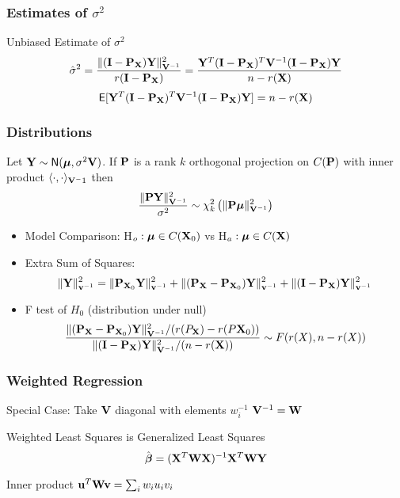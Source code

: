 \documentclass[]{beamer}
\begin{document}
\begin{frame}
  \frametitle{Estimates of $\sigma^2$}
\vspace{-24pt}
Unbiased Estimate of $\sigma^2$ 
$$ \shat = \frac{\| (\I - \P_\X)\Y \|^2_{\V^{-1}}}{r(\I - \P_\X)} =
\frac{\Y^T(\I - \P_{\X})^T \V^{-1}   (\I - \P_{\X}) \Y}{n - r(\X)}$$ 
$$\E[\Y^T(\I - \P_{\X})^T \V^{-1}   (\I - \P_{\X}) \Y] = n - r(\X)$$
\vfill
\end{frame}

\begin{frame}
  \frametitle{Distributions}
  \begin{theorem}
Let $\Y \sim \N(\mub, \sigma^2\V)$.
If $\P$ is a rank $k$ orthogonal projection on $C(\P)$ with
inner product $\langle \cdot, \cdot \rangle_{\V^-1}$ then 
$$ \frac{\| \P \Y \|^2_{\V^{-1}}}{\sigma^2} \sim \chi^2_{k}
\left( \| \P \mub \|^2_{\V^{-1}}\right)$$  
  \end{theorem} \pause


  \begin{itemize}
  \item Model Comparison:  H$_o: \mub \in C(\X_0)$ vs H$_a: \mub \in
    C(\X)$ \pause
  \item Extra Sum of Squares:  
$$ \|\Y\|^2_{\v^{-1}} = \|\P_{\X_0}\Y\|^2_{\v^{-1}} + \|( \P_\X -
\P_{\X_0})\Y\|^2_{\v^{-1}} + \|(\I - \P_{\X})\Y\|^2_{\v^{-1}}$$ \pause
\item  F test of $H_0$  (distribution under null)
$$  \frac{\|( \P_\X - \P_{\X_0}) \Y \|^2_{\V^{-1}}/(r(P_\X) - r(P{\X_0}))}{\| (\I - \P_\X)\Y
  \|^2_{\V^{-1}}/(n - r(\X)) } \sim F(r(X), n-r(X)) $$
    
\end{itemize}


\end{frame}
\begin{frame}
  \frametitle{Weighted Regression}
Special Case: Take $\V$ diagonal with elements $w_i^{-1}$ $\V^{-1} = \W$

Weighted Least Squares is Generalized Least Squares 
$$\bhat = (\X^T \W \X)^{-1} \X^T\W\Y$$

Inner product $\u^T \W \v = \sum_i w_i u_i v_i$
\end{frame}
\end{document}

